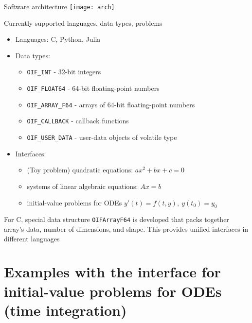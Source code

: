 \documentclass[10pt, aspectratio=169, progressbar=frametitle]{beamer}
\begin{document}
\begin{frame}{Software architecture}
  \centering
  \texttt{[image: arch]}
\end{frame}

\begin{frame}{Currently supported languages, data types, problems}
  \begin{itemize}
    \item Languages: C, Python, Julia
    \item Data types:
          \begin{itemize}
            \item \texttt{OIF\_INT} - 32-bit integers
            \item \texttt{OIF\_FLOAT64} - 64-bit floating-point numbers
            \item \texttt{OIF\_ARRAY\_F64} - arrays of 64-bit floating-point numbers
            \item \texttt{OIF\_CALLBACK} - callback functions
            \item \texttt{OIF\_USER\_DATA} - user-data objects of volatile type
          \end{itemize}
    \item Interfaces:
          \begin{itemize}
            \item (Toy problem) quadratic equations: $ax^2 + bx + c = 0$
            \item systems of linear algebraic equations: $Ax = b$
            \item initial-value problems for ODEs \(y'(t) = f(t, y), \  y(t_0) = y_0\)
          \end{itemize}
  \end{itemize}

  {\small For C, special data structure \texttt{OIFArrayF64} is developed that packs
  together array's data, number of dimensions, and shape.
  This provides unified interfaces in different languages}
\end{frame}

\section{Examples with the interface for initial-value problems for ODEs (time integration)}
\end{document}
